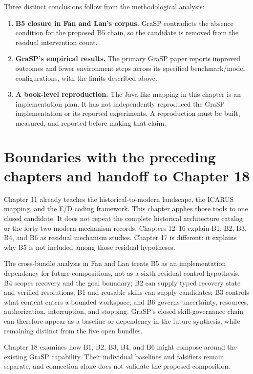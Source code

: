 Three distinct conclusions follow from the methodological analysis:

\begin{enumerate}
  \item \textbf{B5 closure in Fan and Lan's corpus.} GraSP contradicts the absence condition for the proposed B5 chain, so the candidate is removed from the residual intervention count.
  \item \textbf{GraSP's empirical results.} The primary GraSP paper reports improved outcomes and fewer environment steps across its specified benchmark/model configurations, with the limits described above.
  \item \textbf{A book-level reproduction.} The Java-like mapping in this chapter is an implementation plan. It has not independently reproduced the GraSP implementation or its reported experiments. A reproduction must be built, measured, and reported before making that claim.
\end{enumerate}

\section{Boundaries with the preceding chapters and handoff to Chapter 18}
\label{sec:ch17-cross-chapter-boundaries}

Chapter 11 already teaches the historical-to-modern landscape, the ICARUS mapping, and the E/D coding framework. This chapter applies those tools to one closed candidate. It does not repeat the complete historical architecture catalog or the forty-two modern mechanism records. Chapters 12--16 explain B1, B2, B3, B4, and B6 as residual mechanism studies. Chapter 17 is different: it explains why B5 is not included among those residual hypotheses.

The cross-bundle analysis in Fan and Lan treats B5 as an implementation dependency for future compositions, not as a sixth residual control hypothesis. B4 scopes recovery and the goal boundary; B2 can supply typed recovery state and verified resolutions; B1 and reusable skills can supply candidates; B3 controls what content enters a bounded workspace; and B6 governs uncertainty, resources, authorization, interruption, and stopping. GraSP's closed skill-governance chain can therefore appear as a baseline or dependency in the future synthesis, while remaining distinct from the five open bundles.

Chapter 18 examines how B1, B2, B3, B4, and B6 might compose around the existing GraSP capability. Their individual baselines and falsifiers remain separate, and connection alone does not validate the proposed composition.

